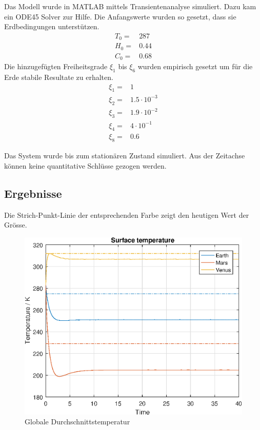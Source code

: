 \begin{refsection}
Das Modell wurde in MATLAB mittels Transientenanalyse simuliert. Dazu kam ein ODE45 Solver zur Hilfe. Die Anfangswerte wurden so gesetzt, dass sie Erdbedingungen unterstützen.  
\begin{equation}
\begin{matrix}
T_0 = & 287 \\
H_0 = & 0.44 \\
C_0 = & 0.68
\end{matrix}
\end{equation}
Die hinzugefügten Freiheitsgrade $\xi_1$ bis $\xi_6$ wurden empirisch gesetzt um für die Erde stabile Resultate zu erhalten.
\begin{equation}
\begin{matrix}
\xi_1 = & 1                 \\
\xi_2 = & 1.5 \cdot 10^{-3} \\
\xi_3 = & 1.9 \cdot 10^{-2} \\
\xi_4 = & 4   \cdot 10^{-1} \\
\xi_8 = & 0.6
\end{matrix}
\end{equation}

Das System wurde bis zum stationären Zustand simuliert. Aus der Zeitachse können keine quantitative Schlüsse gezogen werden.

\subsection{Ergebnisse}

		Die Strich-Punkt-Linie der entsprechenden Farbe zeigt den heutigen Wert der Grösse. 

		\begin{figure}
			\center
			\includegraphics[height=0.45\textheight]{planeten/Matlab/figures/surfaceTemperature.eps}
			\caption{Globale Durchschnittstemperatur}
		\end{figure}
		

\end{refsection}
